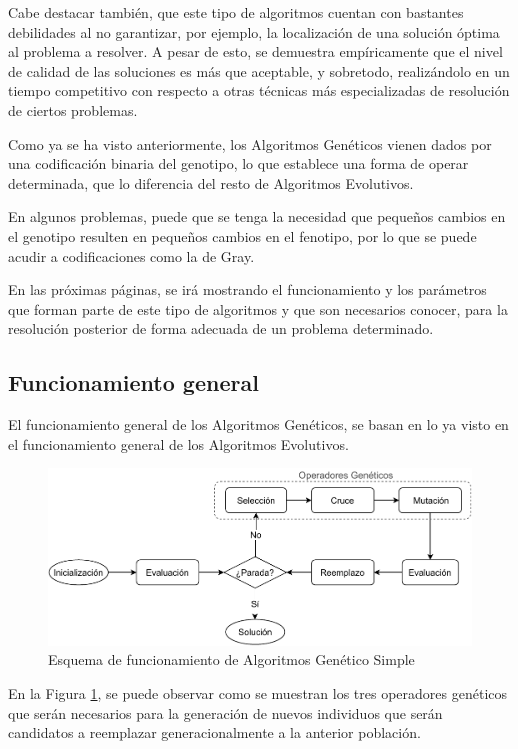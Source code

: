 Cabe destacar también, que este tipo de algoritmos cuentan con bastantes debilidades al no garantizar, por ejemplo, la localización de una solución óptima al problema a resolver. A pesar de esto, se demuestra empíricamente que el nivel de calidad de las soluciones es más que aceptable, y sobretodo, realizándolo en un tiempo competitivo con respecto a otras técnicas más especializadas de resolución de ciertos problemas.

Como ya se ha visto anteriormente, los Algoritmos Genéticos vienen dados por una codificación binaria del genotipo, lo que establece una forma de operar determinada, que lo diferencia del resto de Algoritmos Evolutivos.

En algunos problemas, puede que se tenga la necesidad que pequeños cambios en el genotipo resulten en pequeños cambios en el fenotipo, por lo que se puede acudir a codificaciones como la de Gray.

En las próximas páginas, se irá mostrando el funcionamiento y los parámetros que forman parte de este tipo de algoritmos y que son necesarios conocer, para la resolución posterior de forma adecuada de un problema determinado.

\subsection{Funcionamiento general}

El funcionamiento general de los Algoritmos Genéticos, se basan en lo ya visto en el funcionamiento general de los Algoritmos Evolutivos.

\begin{figure}[h]
    \centering
    \includegraphics[width=\textwidth]{figuras/desarrollo teorico/Esquema_algoritmo_genetico.pdf}
    \caption{Esquema de funcionamiento de Algoritmos Genético Simple}
    \label{fig:diagrama_alg_genetico}
\end{figure}

En la Figura \ref{fig:diagrama_alg_genetico}, se puede observar como se muestran los tres operadores genéticos que serán necesarios para la generación de nuevos individuos que serán candidatos a reemplazar generacionalmente a la anterior población.

